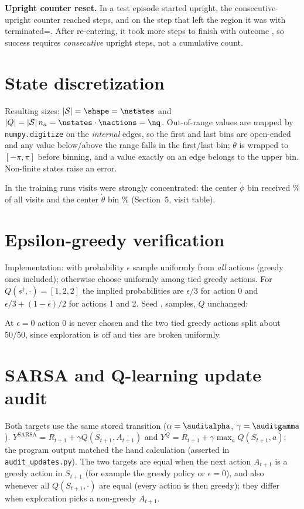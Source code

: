 \documentclass[11pt]{article}
\begin{document}
\textbf{Upright counter reset.} In a test episode started upright, the consecutive-upright counter reached \ctrBefore{} steps, and on the step that left the region it was \ctrAfter{} with terminated=\ctrTermExit. After re-entering, it took \ctrReentry{} more steps to finish with outcome \ctrOutcome, so success requires \successsteps{} \emph{consecutive} upright steps, not a cumulative count.

\section{State discretization}
\begin{center}\end{center}
Resulting sizes: $|\mathcal S|=\shape=\nstates$ and $|Q|=|\mathcal S|\,n_a=\nstates\cdot\nactions=\nq$.
Out-of-range values are mapped by \texttt{numpy.digitize} on the \emph{internal} edges, so the first and last bins are open-ended and any value below/above the range falls in the first/last bin; $\theta$ is wrapped to $[-\pi,\pi]$ before binning, and a value exactly on an edge belongs to the upper bin. Non-finite states raise an error.
\begin{center}\small\end{center}
In the training runs visits were strongly concentrated: the center $\dot\phi$ bin received \phidotCenter\% of all visits and the center $\dot\theta$ bin \thdotCenter\% (Section~5, visit table).

\section{Epsilon-greedy verification}
Implementation: with probability $\epsilon$ sample uniformly from \emph{all} actions (greedy ones included); otherwise choose uniformly among tied greedy actions. For $Q(s^\dagger,\cdot)=[1,2,2]$ the implied probabilities are $\epsilon/3$ for action 0 and $\epsilon/3+(1-\epsilon)/2$ for actions 1 and 2. Seed \epsseed, \epsn{} samples, $Q$ unchanged:
\begin{center}\end{center}
At $\epsilon=0$ action 0 is never chosen and the two tied greedy actions split about 50/50, since exploration is off and ties are broken uniformly.

\section{SARSA and Q-learning update audit}
\begin{center}\small\end{center}
Both targets use the same stored transition ($\alpha=\auditalpha$, $\gamma=\auditgamma$). $Y^{\text{SARSA}}=R_{t+1}+\gamma Q(S_{t+1},A_{t+1})$ and $Y^{Q}=R_{t+1}+\gamma\max_a Q(S_{t+1},a)$; the program output matched the hand calculation (asserted in \texttt{audit\_updates.py}). The two targets are equal when the next action $A_{t+1}$ is a greedy action in $S_{t+1}$ (for example the greedy policy or $\epsilon=0$), and also whenever all $Q(S_{t+1},\cdot)$ are equal (every action is then greedy); they differ when exploration picks a non-greedy $A_{t+1}$.
\end{document}
